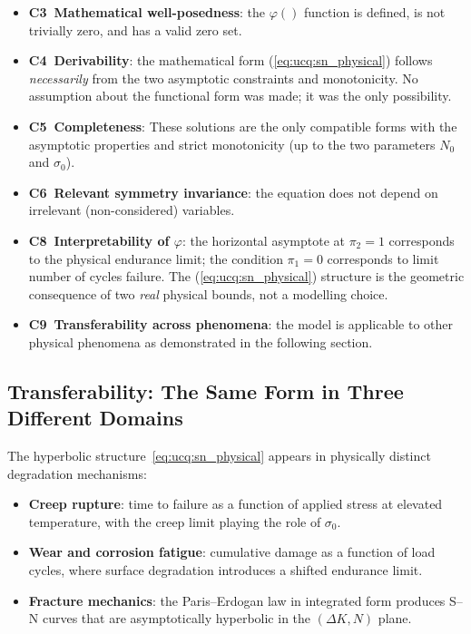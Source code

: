 \begin{itemize}[leftmargin=2.5em]
  \item \textbf{C3~Mathematical well-posedness}: the $\varphi()$ function is defined, is not trivially zero, and has a
     valid zero set.
  \item \textbf{C4~Derivability}: the mathematical form (\ref{eq:ucq:sn_physical}) follows
    \emph{necessarily} from the two asymptotic constraints and
    monotonicity.  No assumption about the functional form was
    made; it was the only possibility.
  \item \textbf{C5~Completeness}: These solutions are the
    only compatible forms with the asymptotic properties and strict monotonicity (up to the two parameters $N_0$ and $\sigma_0$).
  \item \textbf{C6~Relevant symmetry invariance}: the equation does not depend on irrelevant (non-considered) variables.
  \item \textbf{C8~Interpretability of $\varphi$}: the horizontal
    asymptote at $\pi_2=1$ corresponds to the physical
    endurance limit; the condition $\pi_1=0$ corresponds to limit number of cycles
    failure.  The (\ref{eq:ucq:sn_physical}) structure is the geometric consequence
    of two \emph{real} physical bounds, not a modelling choice.
  \item \textbf{C9~Transferability across phenomena}: the model is applicable to other physical phenomena as demonstrated in the following section.
\end{itemize}

\subsection{Transferability: The Same Form in Three Different Domains}

The hyperbolic structure~\eqref{eq:ucq:sn_physical} appears in
physically distinct degradation mechanisms:

\begin{itemize}[leftmargin=2.5em]
  \item \textbf{Creep rupture}: time to failure as a function of
    applied stress at elevated temperature, with the creep limit
    playing the role of $\sigma_0$.
  \item \textbf{Wear and corrosion fatigue}: cumulative damage as a
    function of load cycles, where surface degradation introduces a
    shifted endurance limit.
  \item \textbf{Fracture mechanics}: the Paris--Erdogan law in
    integrated form produces S--N curves that are asymptotically
    hyperbolic in the $(\Delta K,N)$ plane.
\end{itemize}

